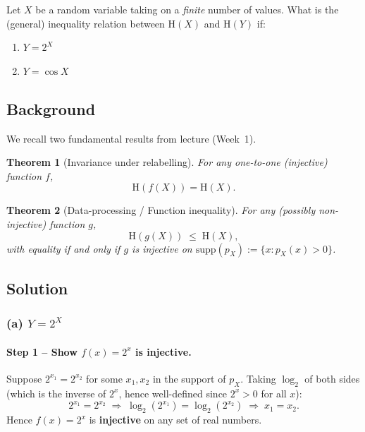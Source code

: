 \documentclass[12pt,a4paper]{article}
\theoremstyle{plain}
\newtheorem{theorem}{Theorem}[section]
\theoremstyle{definition}
\theoremstyle{remark}
\newcommand{\HH}{\mathrm{H}}
\newcommand{\supp}{\mathrm{supp}}
\begin{document}
Let $X$ be a random variable taking on a \emph{finite} number of values.
What is the (general) inequality relation between $\HH(X)$ and $\HH(Y)$ if:

\begin{enumerate}[label=\textbf{(\alph*)}]
  \item $Y = 2^X$
  \item $Y = \cos X$
\end{enumerate}

\subsection*{Background}

We recall two fundamental results from lecture (Week~1).

\begin{theorem}[Invariance under relabelling]\label{thm:inv}
  For any one-to-one (injective) function $f$,
  \[
    \HH(f(X)) = \HH(X).
  \]
\end{theorem}

\begin{theorem}[Data-processing / Function inequality]\label{thm:func}
  For any (possibly non-injective) function $g$,
  \[
    \HH(g(X)) \;\le\; \HH(X),
  \]
  with equality if and only if $g$ is injective on $\supp(p_X)
  := \{x : p_X(x)>0\}$.
\end{theorem}

\subsection*{Solution}

\subsubsection*{(a) $Y = 2^X$}

\paragraph{Step 1 – Show $f(x) = 2^x$ is injective.}

Suppose $2^{x_1} = 2^{x_2}$ for some $x_1, x_2$ in the support of $p_X$.
Taking $\log_2$ of both sides (which is the inverse of $2^x$, hence well-defined since $2^x>0$ for all $x$):
\[
  2^{x_1} = 2^{x_2}
  \;\Longrightarrow\;
  \log_2\!\left(2^{x_1}\right) = \log_2\!\left(2^{x_2}\right)
  \;\Longrightarrow\;
  x_1 = x_2.
\]
Hence $f(x)=2^x$ is \textbf{injective} on any set of real numbers.
\end{document}
